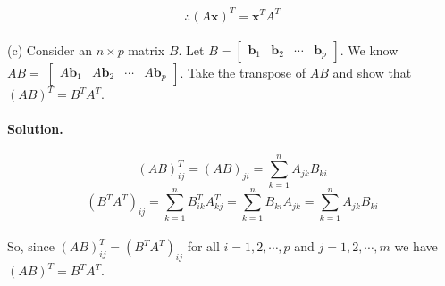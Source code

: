 $$\therefore (A\mathbf{x})^T = \mathbf{x}^T A^T$$\\

(c) Consider an $n\times p$ matrix $B$.
Let $B=\begin{bmatrix}
    \mathbf{b}_1 & \mathbf{b}_2 & \cdots & \mathbf{b}_p
\end{bmatrix}$.
We know $AB=􏰀\begin{bmatrix}
    A\mathbf{b}_1 & A\mathbf{b}_2 & \cdots & A\mathbf{b}_p
\end{bmatrix}$.
Take the transpose of $AB$ and show that $(AB)^T = B^T A^T$.
\paragraph{Solution.}
$$(AB)^T_{ij}=(AB)_{ji}=\sum^n_{k=1}A_{jk}B_{ki}$$
$$(B^TA^T)_{ij} = \sum^n_{k=1}B^T_{ik}A^T_{kj}=\sum^n_{k=1}B_{ki}A_{jk}=\sum^n_{k=1}A_{jk}B_{ki}$$\\
So, since $(AB)^T_{ij}=(B^TA^T)_{ij}$ for all $i = 1, 2, \cdots, p$ and $j = 1, 2, \cdots, m$ we have
$(AB)^T=B^TA^T$.
\newpage
